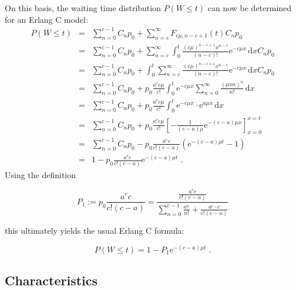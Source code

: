 \documentclass[a4paper,11pt,oneside]{article}
\theoremstyle{definition}
\begin{document}
On this basis, the waiting time distribution $P(W\le t)$ can now be determined for an Erlang C model:
{
\allowdisplaybreaks
\begin{eqnarray*}
P(W\le t)&=&
\sum_{n=0}^{c-1}C_np_0+\sum_{n=c}^\infty F_{c\mu,n-c+1}(t)C_np_0\\&=&
\sum_{n=0}^{c-1}C_np_0+\sum_{n=c}^\infty \int_0^t \frac{(c\mu)^{n-c+1}x^{n-c}}{(n-c)!}\mathrm{e}^{-c\mu x}\,\mbox{d}x C_np_0\\&=&
\sum_{n=0}^{c-1}C_np_0+\int_0^t\sum_{n=c}^\infty \frac{(c\mu)^{n-c+1}x^{n-c}}{(n-c)!}\mathrm{e}^{-c\mu x}\,\mbox{d}x C_np_0\\&=&
\sum_{n=0}^{c-1}C_np_0+p_0\frac{a^cc\mu}{c!}\int_0^t \mathrm{e}^{-c\mu x}\sum_{n=0}^\infty \frac{(\mu xa)^n}{n!}\,\mbox{d}x\\&=&
\sum_{n=0}^{c-1}C_np_0+p_0\frac{a^cc\mu}{c!}\int_0^t \mathrm{e}^{-c\mu x}\cdot \mathrm{e}^{a\mu x}\,\mbox{d}x\\&=&
\sum_{n=0}^{c-1}C_np_0+p_0\frac{a^cc\mu}{c!}\left[-\frac{1}{(c-a)\mu}\mathrm{e}^{-(c-a)\mu x}\right]_{x=0}^{x=t}\\&=&
\sum_{n=0}^{c-1}C_np_0-p_0\frac{a^cc}{c!(c-a)}\left(\mathrm{e}^{-(c-a)\mu t}-1\right)\\&=&
1-p_0\frac{a^cc}{c!(c-a)}\mathrm{e}^{-(c-a)\mu t}\;.
\end{eqnarray*}
}
Using the definition
\begin{tcolorbox}
\begin{equation}\label{MMcP1ErlangCBeweis}
P_1:=p_0\frac{a^cc}{c!(c-a)}=\frac{\frac{a^cc}{c!(c-a)}}{\sum_{n=0}^{c-1}\frac{a^n}{n!}+\frac{a^c\cdot c}{c!(c-a)}}
\end{equation}
\end{tcolorbox}
this ultimately yields the usual Erlang C formula:
\begin{tcolorbox}
$$
P(W\le t)=1-P_1\mathrm{e}^{-(c-a)\mu t}\;.
$$
\end{tcolorbox}

\subsection{Characteristics}
\end{document}
